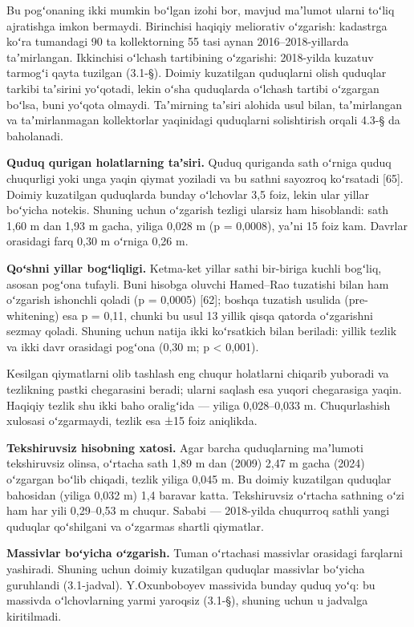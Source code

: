 \documentclass[14pt,a4paper,oneside]{extreport}
\begin{document}
Bu pogʻonaning ikki mumkin boʻlgan izohi bor, mavjud maʼlumot ularni
toʻliq ajratishga imkon bermaydi. Birinchisi haqiqiy meliorativ
oʻzgarish: kadastrga koʻra tumandagi 90 ta kollektorning 55 tasi aynan
2016--2018-yillarda taʼmirlangan. Ikkinchisi oʻlchash tartibining
oʻzgarishi: 2018-yilda kuzatuv tarmogʻi qayta tuzilgan (3.1-§). Doimiy
kuzatilgan quduqlarni olish quduqlar tarkibi taʼsirini yoʻqotadi, lekin
oʻsha quduqlarda oʻlchash tartibi oʻzgargan boʻlsa, buni yoʻqota
olmaydi. Taʼmirning taʼsiri alohida usul bilan, taʼmirlangan va
taʼmirlanmagan kollektorlar yaqinidagi quduqlarni solishtirish orqali
4.3-§ da baholanadi.

\textbf{Quduq qurigan holatlarning taʼsiri.} Quduq quriganda sath
oʻrniga quduq chuqurligi yoki unga yaqin qiymat yoziladi va bu sathni
sayozroq koʻrsatadi {[}65{]}. Doimiy kuzatilgan quduqlarda bunday
oʻlchovlar 3,5 foiz, lekin ular yillar boʻyicha notekis. Shuning uchun
oʻzgarish tezligi ularsiz ham hisoblandi: sath 1,60 m dan 1,93 m gacha,
yiliga 0,028 m (p = 0,0008), yaʼni 15 foiz kam. Davrlar orasidagi farq
0,30 m oʻrniga 0,26 m.

\textbf{Qoʻshni yillar bogʻliqligi.} Ketma-ket yillar sathi bir-biriga
kuchli bogʻliq, asosan pogʻona tufayli. Buni hisobga oluvchi Hamed--Rao
tuzatishi bilan ham oʻzgarish ishonchli qoladi (p = 0,0005) {[}62{]};
boshqa tuzatish usulida (pre-whitening) esa p = 0,11, chunki bu usul 13
yillik qisqa qatorda oʻzgarishni sezmay qoladi. Shuning uchun natija
ikki koʻrsatkich bilan beriladi: yillik tezlik va ikki davr orasidagi
pogʻona (0,30 m; p \textless{} 0,001).

Kesilgan qiymatlarni olib tashlash eng chuqur holatlarni chiqarib
yuboradi va tezlikning pastki chegarasini beradi; ularni saqlash esa
yuqori chegarasiga yaqin. Haqiqiy tezlik shu ikki baho oraligʻida ---
yiliga 0,028--0,033 m. Chuqurlashish xulosasi oʻzgarmaydi, tezlik esa
±15 foiz aniqlikda.

\textbf{Tekshiruvsiz hisobning xatosi.} Agar barcha quduqlarning
maʼlumoti tekshiruvsiz olinsa, oʻrtacha sath 1,89 m dan (2009) 2,47 m
gacha (2024) oʻzgargan boʻlib chiqadi, tezlik yiliga 0,045 m. Bu doimiy
kuzatilgan quduqlar bahosidan (yiliga 0,032 m) 1,4 baravar katta.
Tekshiruvsiz oʻrtacha sathning oʻzi ham har yili 0,29--0,53 m chuqur.
Sababi --- 2018-yilda chuqurroq sathli yangi quduqlar qoʻshilgani va
oʻzgarmas shartli qiymatlar.

\textbf{Massivlar boʻyicha oʻzgarish.} Tuman oʻrtachasi massivlar
orasidagi farqlarni yashiradi. Shuning uchun doimiy kuzatilgan quduqlar
massivlar boʻyicha guruhlandi (3.1-jadval). Y.Oxunboboyev massivida
bunday quduq yoʻq: bu massivda oʻlchovlarning yarmi yaroqsiz (3.1-§),
shuning uchun u jadvalga kiritilmadi.
\end{document}

